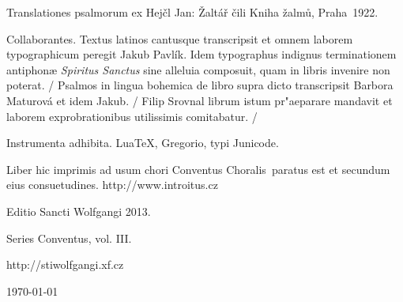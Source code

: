 \documentclass[a4paper, twoside, 12pt]{article}
\newcommand{\annusEditionis}{2013}
\begin{document}
Translationes psalmorum ex
Hejčl Jan: Žaltář čili Kniha žalmů, Praha~1922.

Collaborantes.
Textus latinos cantusque transcripsit et omnem laborem typographicum peregit
Jakub Pavlík. Idem typographus indignus terminationem antiphonæ
\textit{Spiritus Sanctus} sine alleluia composuit, quam in libris invenire
non poterat. /
Psalmos in lingua bohemica de libro supra dicto transcripsit
Barbora Maturová et idem Jakub. /
Filip Srovnal librum istum pr"aeparare mandavit et laborem exprobrationibus
utilissimis comitabatur. /

Instrumenta adhibita.
LuaTeX, %
Gregorio, %
typi Junicode. %

\begin{center}
Liber hic imprimis ad usum chori 
\guillemotright Conventus Choralis\guillemotleft\ 
paratus est
et secundum eius consuetudines.
http://www.introitus.cz

\vspace{1cm}

{\large Editio Sancti Wolfgangi \annusEditionis .}

\vspace{2mm}

Series \guillemotright Conventus\guillemotleft, vol. III.

\vspace{1cm}

http://stiwolfgangi.xf.cz

\vfill

\today

\end{center}
\end{document}
